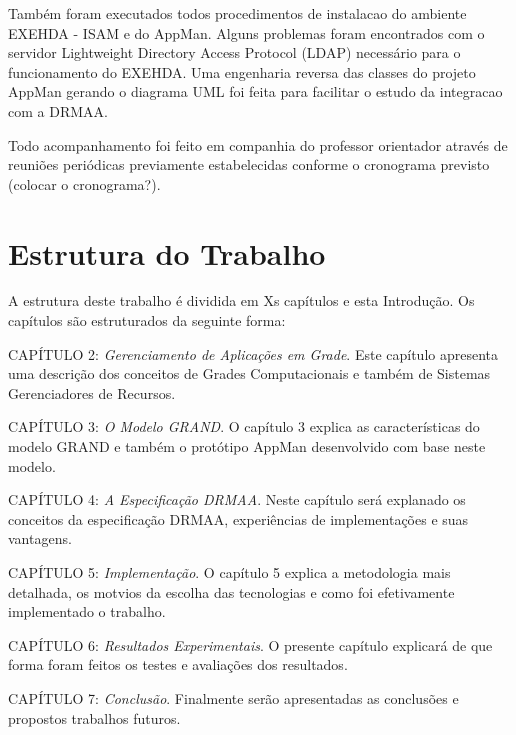 Também foram executados todos procedimentos de instalacao do ambiente EXEHDA - ISAM e do AppMan. Alguns problemas foram encontrados com o servidor Lightweight Directory Access Protocol (LDAP) necessário para o funcionamento do EXEHDA. Uma engenharia reversa das classes do projeto AppMan gerando o diagrama UML foi feita para facilitar o estudo da integracao com a DRMAA.

Todo acompanhamento foi feito em companhia do professor orientador através de reuniões periódicas previamente estabelecidas conforme o cronograma previsto (colocar o cronograma?).

\section{Estrutura do Trabalho}
A estrutura deste trabalho é dividida em Xs capítulos e esta Introdução. Os capítulos são estruturados da seguinte forma:

CAPÍTULO 2: \emph{Gerenciamento de Aplicações em Grade}. Este capítulo apresenta uma descrição dos conceitos de Grades Computacionais e também de Sistemas Gerenciadores de Recursos.

CAPÍTULO 3: \emph{O Modelo GRAND}. O capítulo 3 explica as características do modelo GRAND e também o protótipo AppMan desenvolvido com base neste modelo.

CAPÍTULO 4: \emph{A Especificação DRMAA}. Neste capítulo será explanado os conceitos da especificação DRMAA, experiências de implementações e suas vantagens.

CAPÍTULO 5: \emph{Implementação}. O capítulo 5 explica a metodologia mais detalhada, os motvios da escolha das tecnologias e como foi efetivamente implementado o trabalho.

CAPÍTULO 6: \emph{Resultados Experimentais}. O presente capítulo explicará de que forma foram feitos os testes e avaliações dos resultados.

CAPÍTULO 7: \emph{Conclusão}. Finalmente serão apresentadas as conclusões e propostos trabalhos futuros.
